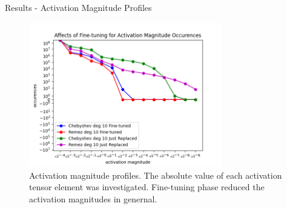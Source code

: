 \documentclass[9pt]{beamer}
\begin{document}
\begin{frame}{Results - Activation Magnitude Profiles}
    \begin{figure}[!h]
        \centering
        \includegraphics[width=0.75\textwidth]{resource/finetune_profile.png}
        \caption{Activation magnitude profiles. The absolute value of each activation tensor element was investigated. Fine-tuning phase reduced the activation magnitudes in genernal.}
        \label{fig:affects_finetune_profile}
    \end{figure}
\end{frame}
\end{document}
